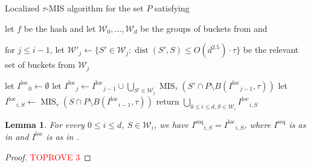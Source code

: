 \documentclass[11pt,letterpaper]{article}
\theoremstyle{plain}
\newtheorem{lemma}[theorem]{Lemma}
\theoremstyle{definition}
\theoremstyle{remark}
\DeclareMathOperator{\dist}{dist}
\DeclareMathOperator{\MIS}{MIS}
\newcommand{\Iseq}{\ensuremath{I^{\mathrm{seq}}}\xspace}
\newcommand{\Iloc}{\ensuremath{I^{\mathrm{loc}}}\xspace}
\begin{document}
\begin{algorithm}[ht]
\caption{Localized $\tau$-MIS algorithm for the set $P$ satisfying }
\label{alg:loc_MIS}
\begin{algorithmic}[1]


    \State let $f$ be the hash and let $\mathcal{W}_0, \ldots, \mathcal{W}_d$ be the groups of buckets from  and 
    
    
    \State for $j \leq i - 1$, let $\mathcal{W}'_j \gets \{ S' \in  \mathcal{W}_j : \dist(S', S) \leq O(d^{2.5}) \cdot \tau \}$ be the relevant set of buckets from $\mathcal{W}_j$
    \label{line:Wjprime}
    
    \State let $\Iloc_0 \gets \emptyset$ 
    \State let $\Iloc_j \gets \Iloc_{j - 1} \cup \bigcup_{S' \in \mathcal{W}_j^{'}} \MIS_{\tau}(S'\cap P\setminus B(\Iloc_{j-1}, \tau))$ 
    \label{line:Iloc_i_def}
    \EndFor
    \State let $\Iloc_{i, S} \gets \MIS_\tau(S \cap P \setminus B(\Iloc_{i - 1}, \tau))$
    \label{line:Iloc_MIS_def}
    \EndFor
    \EndFor
    \State return $\bigcup_{0\leq i \leq d, S \in \mathcal{W}_i} \Iloc_{i, S}$
    \label{line:Iloc_d_def}
\end{algorithmic}
\end{algorithm}





















\begin{lemma}
\label{lemma:couple-seq-loc}
    For every $0 \leq i \leq d$, $S \in \mathcal{W}_i$, we have $\Iseq_{i, S} = \Iloc_{i, S}$, where $\Iseq$ is as in  and $\Iloc$ is as in .
\end{lemma}
\begin{proof}\textcolor{red}{TOPROVE 3}\end{proof}
\end{document}
